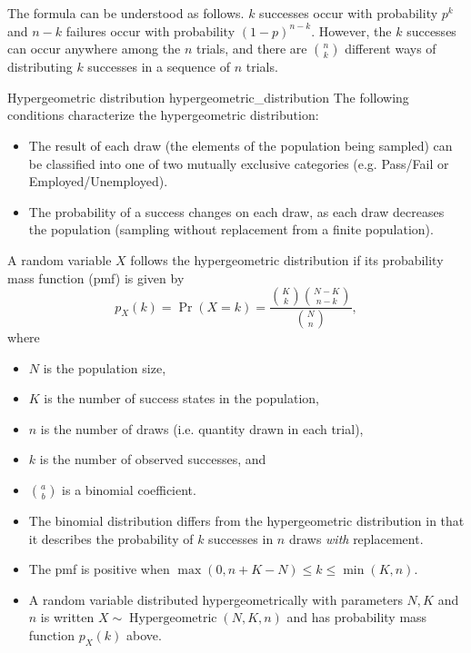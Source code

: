 The formula can be understood as follows. $k$ successes occur with probability $p^k$ and $n - k$ failures occur with probability $(1 - p)^{n - k}$. However, the $k$ successes can occur anywhere among the $n$ trials, and there are $\binom{n}{k}$ different ways of distributing $k$ successes in a sequence of $n$ trials. \cite{wikipedia_binomial_distribution}

\begin{definition}{Hypergeometric distribution \cite{wikipedia_hypergeometric_distribution}}{hypergeometric_distribution}
	The following conditions characterize the hypergeometric distribution:

	\begin{itemize}
		\item The result of each draw (the elements of the population being sampled) can be classified into one of two mutually exclusive categories (e.g. Pass/Fail or Employed/Unemployed).
		\item The probability of a success changes on each draw, as each draw decreases the population (sampling without replacement from a finite population).
	\end{itemize}	
	
	A random variable $X$ follows the hypergeometric distribution if its probability mass function (pmf) is given by
	$$ 
		p_X(k) = \Pr(X = k) = \frac{\binom{K}{k} \binom{N-K}{n-k}}{\binom{N}{n}},
	$$
	where
	\begin{itemize}
		\item $N$ is the population size,
		\item $K$ is the number of success states in the population,
		\item $n$ is the number of draws (i.e. quantity drawn in each trial),
		\item $k$ is the number of observed successes, and
		\item $a \choose b$ is a binomial coefficient.
	\end{itemize}
\end{definition}

\begin{itemize}
	\item The binomial distribution differs from the hypergeometric distribution in that it describes the probability of $k$ successes in $n$ draws \textit{with} replacement.
	\item The pmf is positive when $\max(0, n + K - N) \leq k \leq \min(K, n)$.
	\item A random variable distributed hypergeometrically with parameters $N, K$ and $n$ is written $X \sim \operatorname{Hypergeometric}(N, K, n)$ and has probability mass function $p_X(k)$ above.
\end{itemize}

